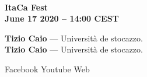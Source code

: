 \documentclass{article}
\makeatletter
\def\fsize#1#2{\fontsize{#1}{#1}\selectfont #2}
\newcommand{\talk}[3]{
  {\textbf{#1}} --- #2. \textit{#3}
} %
\makeatother
\begin{document}
\color{dampBlack}
\begin{flushright}
  \hrulefill\\[2mm]
  \noindent\fsize{40}{\textbf{ItaCa Fest}}\\[5mm]
  \fsize{25}{\textbf{June 17 2020 -- 14:00 CEST}}\\[5mm]
\end{flushright}

\large
\talk{Tizio Caio}{Università de stocazzo}{\lipsum[2]}\\[2em]

\talk{Tizio Caio}{Università de stocazzo}{\lipsum[2]}

\vspace*{\fill}
{\fsize{18}
\noindent \faFacebookSquare Facebook \hspace{\fill}\faYoutube Youtube \hspace{\fill} \faGithubAlt Web}\\
\hrulefill
\end{document}
